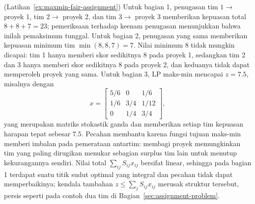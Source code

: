 \begin{solution}(Latihan~\ref{ex:maxmin-fair-assignment})
Untuk bagian 1, penugasan tim $1 \to$ proyek 1, tim $2 \to$ proyek 2, dan tim $3 \to$ proyek 3 memberikan kepuasan total $8 + 8 + 7 = 23$; pemeriksaan terhadap keenam penugasan menunjukkan bahwa inilah pemaksimum tunggal. Untuk bagian 2, penugasan yang sama memberikan kepuasan minimum tim $\min(8,8,7) = 7$. Nilai minimum $8$ tidak mungkin dicapai: tim 1 hanya memberi skor sedikitnya $8$ pada proyek 1, sedangkan tim 2 dan 3 hanya memberi skor sedikitnya $8$ pada proyek 2, dan keduanya tidak dapat memperoleh proyek yang sama. Untuk bagian 3, LP maks-min mencapai $z = 7.5$, misalnya dengan
\[
x = \begin{bmatrix} 5/6 & 0 & 1/6 \\ 1/6 & 3/4 & 1/12 \\ 0 & 1/4 & 3/4 \end{bmatrix},
\]
yang merupakan matriks stokastik ganda dan memberikan setiap tim kepuasan harapan tepat sebesar $7.5$. Pecahan membantu karena fungsi tujuan maks-min memberi imbalan pada pemerataan antartim: membagi proyek memungkinkan tim yang paling dirugikan menukar sebagian surplus tim lain untuk menutup kekurangannya sendiri. Nilai total $\sum_{ij} S_{ij} x_{ij}$ bersifat linear, sehingga pada bagian 1 terdapat suatu titik sudut optimal yang integral dan pecahan tidak dapat memperbaikinya; kendala tambahan $z \leq \sum_j S_{ij} x_{ij}$ merusak struktur tersebut, persis seperti pada contoh dua tim di Bagian~\ref{sec:assignment-problem}.
\end{solution}

